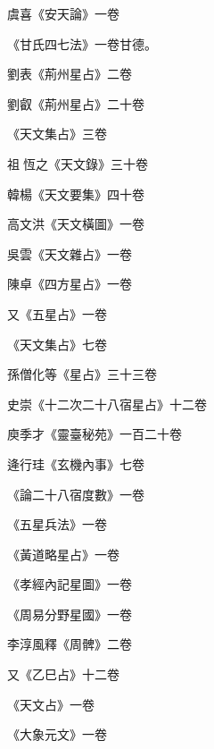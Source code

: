 \begin{pinyinscope}
 虞喜《安天論》一卷



 《甘氏四七法》一卷甘德。



 劉表《荊州星占》二卷



 劉叡《荊州星占》二十卷



 《天文集占》三卷



 祖恆之《天文錄》三十卷



 韓楊《天文要集》四十卷



 高文洪《天文橫圖》一卷



 吳雲《天文雜占》一卷



 陳卓《四方星占》一卷



 又《五星占》一卷



 《天文集占》七卷



 孫僧化等《星占》三十三卷



 史崇《十二次二十八宿星占》十二卷



 庾季才《靈臺秘苑》一百二十卷



 逄行珪《玄機內事》七卷



 《論二十八宿度數》一卷



 《五星兵法》一卷



 《黃道略星占》一卷



 《孝經內記星圖》一卷



 《周易分野星國》一卷



 李淳風釋《周髀》二卷



 又《乙巳占》十二卷



 《天文占》一卷



 《大象元文》一卷




\end{pinyinscope}
